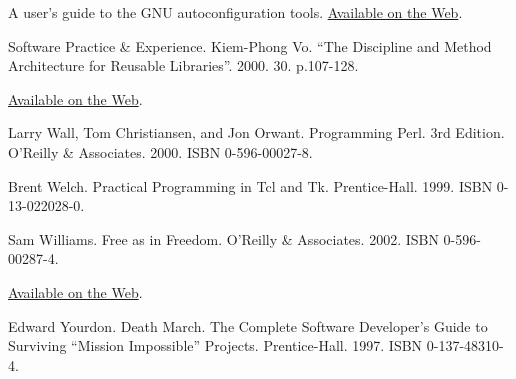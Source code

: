 \documentclass[12pt,oneside]{ctexbook}
\begin{document}
\begin{common-format}
\begin{thebibliography}{9}
A user's guide to the GNU autoconfiguration tools. \href{http://sources.redhat.com/autobook/}{Available on the Web}.

 Software Practice \&{} Experience. Kiem-Phong Vo. “The Discipline and Method Architecture for Reusable Libraries”. 2000. 30. p.107-128.

\href{http://www.research.att.com/sw/tools/vcodex/dm-spe.ps}{Available on the Web}.

 Larry Wall, Tom Christiansen, and Jon Orwant. Programming Perl. 3rd Edition. O'Reilly \&{} Associates. 2000. ISBN 0-596-00027-8.

 Brent Welch. Practical Programming in Tcl and Tk. Prentice-Hall. 1999. ISBN 0-13-022028-0.

 Sam Williams. Free as in Freedom. O'Reilly \&{} Associates. 2002. ISBN 0-596-00287-4.

\href{http://www.oreilly.com/openbook/freedom/index.html}{Available on the Web}.

 Edward Yourdon. Death March. The Complete Software Developer's Guide to Surviving “Mission Impossible” Projects. Prentice-Hall. 1997. ISBN 0-137-48310-4.
\end{thebibliography}



\end{common-format}
\end{document}
